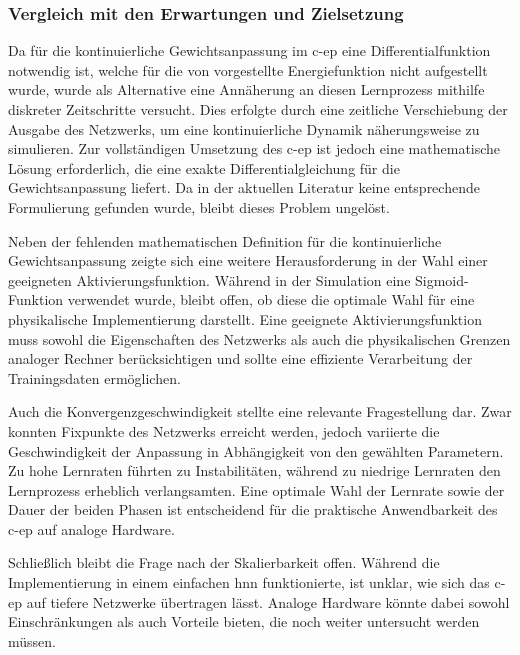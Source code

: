 \subsubsection{Vergleich mit den Erwartungen und Zielsetzung}

Da für die kontinuierliche Gewichtsanpassung im \ac{c-ep} eine Differentialfunktion notwendig ist, welche für die von \citeauthor{Scellier2017} vorgestellte Energiefunktion nicht aufgestellt wurde, wurde als Alternative eine Annäherung an diesen Lernprozess mithilfe diskreter Zeitschritte versucht. Dies erfolgte durch eine zeitliche Verschiebung der Ausgabe des Netzwerks, um eine kontinuierliche Dynamik näherungsweise zu simulieren. Zur vollständigen Umsetzung des \ac{c-ep} ist jedoch eine mathematische Lösung erforderlich, die eine exakte Differentialgleichung für die Gewichtsanpassung liefert. Da in der aktuellen Literatur keine entsprechende Formulierung gefunden wurde, bleibt dieses Problem ungelöst.

Neben der fehlenden mathematischen Definition für die kontinuierliche Gewichtsanpassung zeigte sich eine weitere Herausforderung in der Wahl einer geeigneten Aktivierungsfunktion. Während in der Simulation eine Sigmoid-Funktion verwendet wurde, bleibt offen, ob diese die optimale Wahl für eine physikalische Implementierung darstellt. Eine geeignete Aktivierungsfunktion muss sowohl die Eigenschaften des Netzwerks als auch die physikalischen Grenzen analoger Rechner berücksichtigen und sollte eine effiziente Verarbeitung der Trainingsdaten ermöglichen.

Auch die Konvergenzgeschwindigkeit stellte eine relevante Fragestellung dar. Zwar konnten Fixpunkte des Netzwerks erreicht werden, jedoch variierte die Geschwindigkeit der Anpassung in Abhängigkeit von den gewählten Parametern. Zu hohe Lernraten führten zu Instabilitäten, während zu niedrige Lernraten den Lernprozess erheblich verlangsamten. Eine optimale Wahl der Lernrate sowie der Dauer der beiden Phasen ist entscheidend für die praktische Anwendbarkeit des \ac{c-ep} auf analoge Hardware.

Schließlich bleibt die Frage nach der Skalierbarkeit offen. Während die Implementierung in einem einfachen \ac{hnn} funktionierte, ist unklar, wie sich das \ac{c-ep} auf tiefere Netzwerke übertragen lässt. Analoge Hardware könnte dabei sowohl Einschränkungen als auch Vorteile bieten, die noch weiter untersucht werden müssen.
